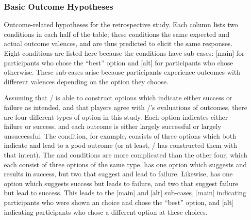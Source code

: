 \subsubsection{Basic Outcome Hypotheses}

\begin{table}[!p]
\centering
\bgroup
\def\arraystretch{1.3}
\setlength{\tabcolsep}{0.6em}

\egroup
\caption[Retrospective outcome hypotheses]{Outcome-related hypotheses for the retrospective study. Each column lists two conditions in each half of the table; these conditions the same expected and actual outcome valences, and are thus predicted to elicit the same responses. Eight conditions are listed here because the  conditions have sub-cases: [main] for participants who chose the ``best'' option and [alt] for participants who chose otherwise. These sub-cases arise because participants experience outcomes with different valences depending on the option they choose.}
  \label{tab:e2-outcome-hypotheses}
\end{table}

Assuming that \dunyazad/ is able to construct options which indicate either success or failure as intended, and that players agree with \dunyazad/'s evaluations of outcomes, there are four different types of option in this study.
%
Each option indicates either failure or success, and each outcome is either largely successful or largely unsuccessful.
%
The \exps{} condition, for example, consists of three options which both indicate and lead to a good outcome (or at least, \dunyazad/ has constructed them with that intent).
%
The \obvs{} and \obvf{} conditions are more complicated than the other four, which each consist of three options of the same type.
%
\obvs{} has one option which suggests and results in success, but two that suggest and lead to failure.
%
Likewise, \obvf{} has one option which suggests success but leads to failure, and two that suggest failure but lead to success.
%
This leads to the [main] and [alt] sub-cases, [main] indicating participants who were shown an  choice and chose the ``best'' option, and [alt] indicating participants who chose a different option at these choices.


